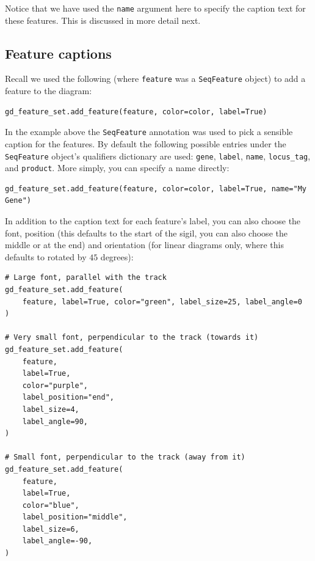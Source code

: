Notice that we have used the \texttt{name} argument here to specify the
caption text for these features.  This is discussed in more detail next.

\subsection{Feature captions}
\label{sec:gd_feature_captions}

Recall we used the following (where \texttt{feature} was a
\verb|SeqFeature| object) to add a feature to the diagram:

\begin{verbatim}
gd_feature_set.add_feature(feature, color=color, label=True)
\end{verbatim}

In the example above the \verb|SeqFeature| annotation was used to pick a
sensible caption for the features.  By default the following possible entries
under the \verb|SeqFeature| object's qualifiers dictionary are used:
\texttt{gene}, \texttt{label}, \texttt{name}, \texttt{locus\_tag}, and
\texttt{product}.  More simply, you can specify a name directly:

\begin{verbatim}
gd_feature_set.add_feature(feature, color=color, label=True, name="My Gene")
\end{verbatim}

In addition to the caption text for each feature's label, you can also choose
the font, position (this defaults to the start of the sigil, you can also
choose the middle or at the end) and orientation (for linear diagrams only,
where this defaults to rotated by $45$ degrees):

\begin{verbatim}
# Large font, parallel with the track
gd_feature_set.add_feature(
    feature, label=True, color="green", label_size=25, label_angle=0
)

# Very small font, perpendicular to the track (towards it)
gd_feature_set.add_feature(
    feature,
    label=True,
    color="purple",
    label_position="end",
    label_size=4,
    label_angle=90,
)

# Small font, perpendicular to the track (away from it)
gd_feature_set.add_feature(
    feature,
    label=True,
    color="blue",
    label_position="middle",
    label_size=6,
    label_angle=-90,
)
\end{verbatim}

